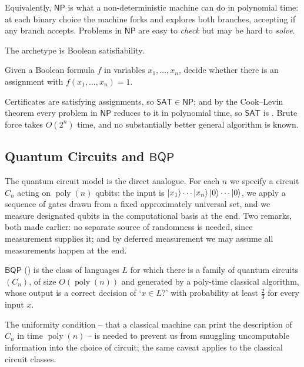 \documentclass[a4paper]{scrartcl}
\newcommand{\class}[1]{\mathsf{#1}}
\DeclareMathOperator{\poly}{poly}
\begin{document}
Equivalently, $\class{NP}$ is what a non-deterministic machine can do in polynomial time: at each binary choice the machine forks and explores both branches, accepting if any branch accepts. Problems in $\class{NP}$ are easy to \emph{check} but may be hard to \emph{solve}.

The archetype is Boolean satisfiability.

\begin{definition}
	Given a Boolean formula $f$ in variables $x_1,\dots,x_n$, decide whether there is an assignment with $f(x_1,\dots,x_n)=1$.
\end{definition}

Certificates are satisfying assignments, so $\mathsf{SAT}\in\class{NP}$; and by the Cook--Levin theorem every problem in $\class{NP}$ reduces to it in polynomial time, so $\mathsf{SAT}$ is \vocab{$\class{NP}$-complete}. Brute force takes $O(2^n)$ time, and no substantially better general algorithm is known.

\subsection{Quantum Circuits and \texorpdfstring{$\class{BQP}$}{BQP}}

The quantum circuit model is the direct analogue. For each $n$ we specify a circuit $C_n$ acting on $\poly(n)$ qubits: the input is $\ket{x_1}\cdots\ket{x_n}\ket{0}\cdots\ket{0}$, we apply a sequence of gates drawn from a fixed approximately universal set, and we measure designated qubits in the computational basis at the end. Two remarks, both made earlier: no separate source of randomness is needed, since measurement supplies it; and by deferred measurement we may assume all measurements happen at the end.

\begin{definition}[$\class{BQP}$]
	$\class{BQP}$ () is the class of languages $L$ for which there is a family of quantum circuits $(C_n)$, of size $O(\poly(n))$ and generated by a poly-time classical algorithm, whose output is a correct decision of `$x\in L$?' with probability at least $\tfrac23$ for every input $x$.
\end{definition}

The uniformity condition -- that a classical machine can print the description of $C_n$ in time $\poly(n)$ -- is needed to prevent us from smuggling uncomputable information into the choice of circuit; the same caveat applies to the classical circuit classes.
\end{document}
